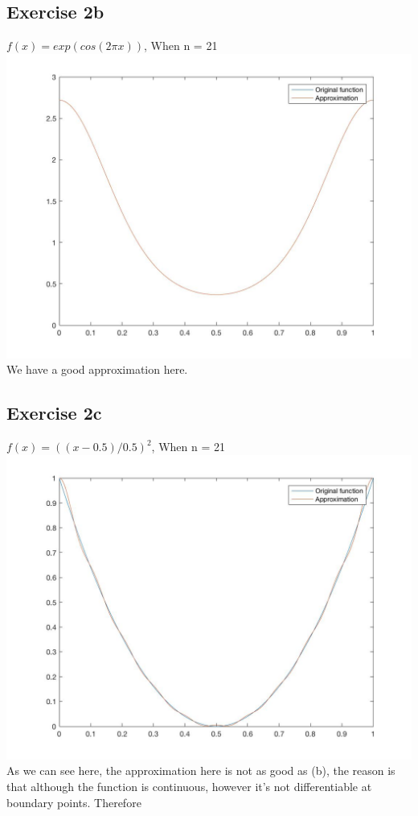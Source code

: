 \documentclass[11pt]{article} %
\begin{document}
\subsection{Exercise 2b}
$f(x)=exp(cos(2\pi x))$, When n = 21\\
\includegraphics[scale=0.3]{e221.jpg}\\
We have a good approximation here.
\subsection{Exercise 2c}
$f(x)=((x-0.5)/0.5)^{2}$, When n = 21\\
\includegraphics[scale=0.3]{e231.jpg}\\
As we can see here, the approximation here is not as good as (b), the reason is that although the function is continuous, however it's not differentiable at boundary points. Therefore 
\end{document}
